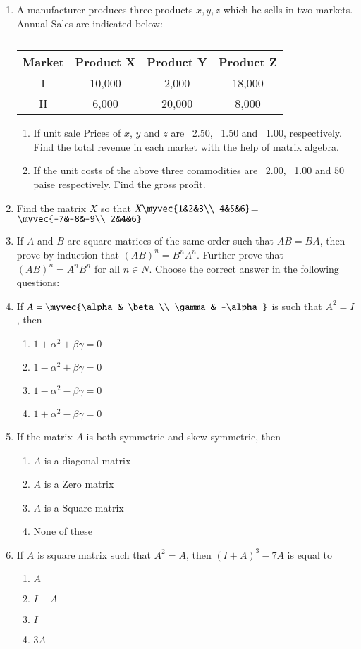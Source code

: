 \documentclass{article}
\theoremstyle{remark}
\begin{document}
\begin{enumerate}
\item A manufacturer produces three products $x, y, z$ which he sells in two markets. Annual Sales are indicated below:
\begin{table}
\centering
\begin{tabular}{|c|c|c|c|}
\hline
Market &  Product X & Product Y & Product Z\\
\hline
I &10,000 &2,000 &18,000\\
\hline
II &6,000 &20,000 &8,000\\
\hline
\end{tabular}
\caption{}
\end{table}
\begin{enumerate}
\item If unit sale Prices of $x$, $y$ and $z$ are \rupee~2.50, \rupee~1.50 and \rupee~1.00, respectively. Find the total revenue in each market with the help of matrix algebra.
\item If the unit costs of the above three commodities are \rupee~2.00, \rupee~1.00 and $50$ paise respectively. Find the gross profit.
\end{enumerate}
\item Find the matrix $X$ so that $X\myvec{1&2&3\\ 4&5&6}$= $\myvec{-7&-8&-9\\ 2&4&6}$
\item If $A$ and $B$ are square matrices of the same order such that $AB=BA$, then prove by induction that $(AB)^n=B^nA^n$. Further prove that $(AB)^n=A^nB^n$ for all $n \in N$. Choose the correct answer in the following questions:
\item If $A=\myvec{\alpha& \beta \\ \gamma& -\alpha}$ is such that $A^2= I$, then
\begin{enumerate} 
\item $1+ \alpha^2+ \beta \gamma=0$
\item $1-\alpha^2+ \beta \gamma=0$
\item $1-\alpha^2- \beta \gamma=0$
\item $1+\alpha^2- \beta \gamma=0$ 
\end{enumerate}
\item If the matrix $A$ is both symmetric and skew symmetric, then
\begin{enumerate}
\item $A$ is a diagonal matrix
\item $A$ is a Zero matrix
\item $A$ is a Square matrix
\item None of these
\end{enumerate}
\item If $A$ is square matrix such that $A^2=A$, then $(I+A)^3-7A$ is equal to
\begin{enumerate}
\item $A$
\item $I-A$
\item $I$
\item $3A$
\end{enumerate}
\end{enumerate}
\end{document}
